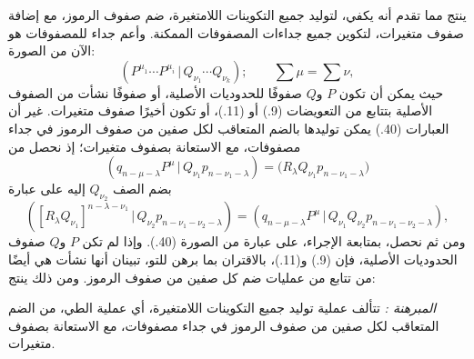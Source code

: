 \documentclass[11pt]{article}
\newcommand{\srcLTR}[1]{\relax\ifmmode\text{\mbox{\babelsublr{\foreignlanguage{english}{#1}}}}\else\babelsublr{\foreignlanguage{english}{#1}}\fi}
\providecommand{\pair}[2]{(#1\,|\,#2)}
\begin{document}
ينتج مما تقدم أنه يكفي، لتوليد جميع التكوينات اللامتغيرة، ضم صفوف الرموز، مع إضافة صفوف متغيرات، لتكوين جميع جداءات المصفوفات الممكنة. وأعم جداء للمصفوفات هو الآن من الصورة:
\begin{equation}
 \pair{P^{\mu_1}\cdots P^{\mu_i}}{Q_{\nu_1}\cdots Q_{\nu_k}};\qquad \sum\mu=\sum\nu,
\tag{40}
\end{equation}
حيث يمكن أن تكون $P$ و$Q$ صفوفًا للحدوديات الأصلية، أو صفوفًا نشأت من الصفوف الأصلية بتتابع من التعويضات (9.) أو (11.)، أو تكون أخيرًا صفوف متغيرات. غير أن العبارات (40.) يمكن توليدها بالضم المتعاقب لكل صفين من صفوف الرموز في جداء مصفوفات، مع الاستعانة بصفوف متغيرات؛ إذ نحصل من
\[
 \pair{q_{n-\mu-\lambda}P^\mu}{Q_{\nu_1}p_{n-\nu_1-\lambda}}
 =\bigl(R_\lambda Q_{\nu_1}p_{n-\nu_1-\lambda}\bigr)
\]
بضم الصف $Q_{\nu_2}$ إليه على عبارة
\[
 \pair{[R_\lambda Q_{\nu_1}]^{n-\lambda-\nu_1}}{Q_{\nu_2}p_{n-\nu_1-\nu_2-\lambda}}
 =\pair{q_{n-\mu-\lambda}P^\mu}{Q_{\nu_1}Q_{\nu_2}p_{n-\nu_1-\nu_2-\lambda}},
\]
ومن ثم نحصل، بمتابعة الإجراء، على عبارة من الصورة (40.). وإذا لم تكن $P$ و$Q$ صفوف الحدوديات الأصلية، فإن (9.) و(11.)، بالاقتران بما برهن للتو، تبينان أنها نشأت هي أيضًا من تتابع من عمليات ضم كل صفين من صفوف الرموز. ومن ذلك ينتج:

\emph{المبرهنة \srcLTR{V}:} تتألف عملية توليد جميع التكوينات اللامتغيرة، أي عملية الطي، من الضم المتعاقب لكل صفين من صفوف الرموز في جداء مصفوفات، مع الاستعانة بصفوف متغيرات.
\end{document}
